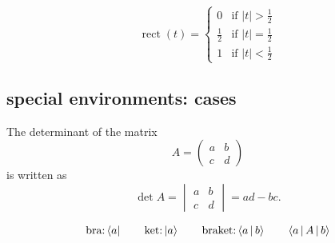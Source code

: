 %

\begin{filecontents*}{\democodefile}
\[ 
\operatorname{rect}(t) =
\begin{cases} 
  0 &           \text{if } |t| > \frac{1}{2} \\ 
  \frac{1}{2} & \text{if } |t| = \frac{1}{2} \\
  1 &           \text{if } |t| < \frac{1}{2}
\end{cases} 
\] 
\end{filecontents*}

\subsection{special environments: cases}

%

\begin{filecontents*}{\democodefile}
The determinant of the matrix
\[ A = \begin{pmatrix} a & b \\ c & d \end{pmatrix} \]
is written as 
\[ \det A  = \begin{vmatrix} a & b \\ c & d \end{vmatrix} = ad-bc. \] 
\end{filecontents*}

%

\begin{filecontents*}{\democodefile}
\begin{equation}
   \text{bra:} \Bra{a} \qquad \text{ket:} \Ket{a} \qquad \text{braket:}
   \Braket{a|b} \qquad \Braket{a|A|b}
\end{equation}
\end{filecontents*}

